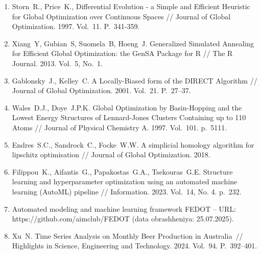 \documentclass[a4paper,12pt,russian]{article}
\begin{document}
\begin{enumerate}
\item \label{rfa:enlit:differential_evolution}
Storn~R., Price~K., Differential Evolution - a Simple and Efficient Heuristic for Global Optimization over Continuous Spaces // Journal of Global Optimization. 1997. Vol.~11. P.~341-359.

\item \label{rfa:enlit:dual_annealing}
Xiang~Y, Gubian~S, Suomela~B, Hoeng~J. Generalized Simulated Annealing for Efficient Global Optimization: the GenSA Package for R // The R Journal. 2013. Vol.~5, No.~1.

\item \label{rfa:enlit:direct}
Gablonsky~J., Kelley~C. A Locally-Biased form of the DIRECT Algorithm // Journal of Global Optimization. 2001. Vol.~21. P.~27--37.

\item \label{rfa:enlit:basinhopping}
Wales~D.J., Doye~J.P.K. Global Optimization by Basin-Hopping and the Lowest Energy Structures of Lennard-Jones Clusters Containing up to 110 Atoms // Journal of Physical Chemistry A. 1997. Vol.~101. p.~5111.

\item \label{rfa:enlit:shgo}
Endres~S.C., Sandrock~C., Focke~W.W. A simplicial homology algorithm for lipschitz optimisation // Journal of Global Optimization. 2018.

\item \label{rfa:enlit:nikitin2022automated}
Filippou~K., Aifantis~G., Papakostas~G.A., Tsekouras~G.E. Structure learning and hy\-per\-pa\-ra\-me\-ter optimization using an automated machine learning ({AutoML}) pipeline // Information. 2023. Vol.~14, No. 4. p.~232.

\item \label{rfa:enlit:FEDOT}
Automated modeling and machine learning framework {FEDOT} -- URL:\\https://github.com/aimclub/FEDOT (data obrashheniya: 25.07.2025).

\item \label{rfa:enlit:MonthlyBeerArticle}
Xu~N. Time Series Analysis on Monthly Beer Production in Australia~// Highlights in Science, Engineering and Technology. 2024. Vol.~94. P.~392--401.%




\end{enumerate}
\end{document}
